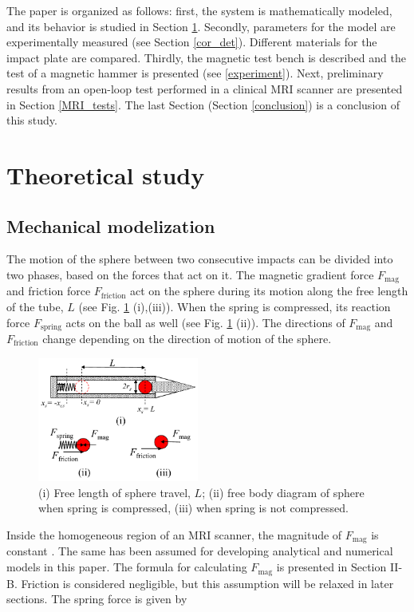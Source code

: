 \documentclass[letterpaper, 10 pt, journal, twoside]{ieeetran}
\begin{document}
The paper is organized as follows: first, the system is mathematically modeled, and its behavior is studied in Section \ref{theoretical}. Secondly, parameters for the model are experimentally measured (see Section \ref{cor_det}). Different materials for the impact plate are compared. Thirdly, the magnetic test bench is described and the test of a magnetic hammer is presented (see \cref{experiment}). Next, preliminary results from an open-loop test performed in a clinical MRI scanner are presented in Section \ref{MRI_tests}. The last Section (Section \ref{conclusion}) is a conclusion of this study.


\section{Theoretical study}
\label{theoretical}
\subsection{Mechanical modelization}
The motion of the sphere between two consecutive impacts can be divided into two  phases, based on the forces that act on it. The magnetic gradient force $F_{\textrm{mag}}$ and friction force $F_{\textrm{friction}}$ act on the sphere during its motion along the free length of the tube, $L$ (see Fig. \ref{FBD} (i),(iii)). When the spring is compressed, its reaction force $F_{\textrm{spring}}$ acts on the ball as well (see Fig. \ref{FBD} (ii)). The directions of $F_{\textrm{mag}}$ and $F_{\textrm{friction}}$  change depending on the direction of motion of the sphere. 
\begin{figure}
	\begin{centering}
	\includegraphics[width=150pt]{FBD_R1.pdf}
	\caption{(i) Free length of sphere travel, $L$; (ii) free body diagram of sphere when spring is compressed, (iii) when spring is not compressed.}
	\label{FBD}
	\end{centering}
	\end{figure}
Inside the homogeneous region of an MRI scanner, the magnitude of $F_{\textrm{mag}}$ is constant \cite{CMR:CMR20163}. The same has been assumed for developing analytical and numerical models in this paper. The formula for calculating $F_{\textrm{mag}}$ is presented in Section II-B. Friction is considered negligible, but this assumption will be relaxed in later sections. The spring force is given by
\end{document}
